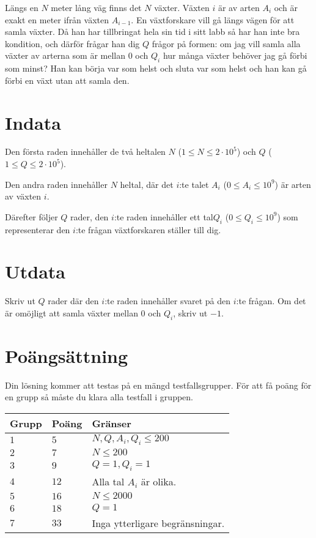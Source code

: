 Längs en $N$ meter lång väg finns det $N$ växter. Växten $i$ är av arten $A_i$ och är exakt en meter ifrån växten $A_{i-1}$. En växtforskare vill gå längs vägen för att samla växter. Då han har tillbringat hela sin tid i sitt labb så har han inte bra kondition,
och därför frågar han dig $Q$ frågor på formen: om jag vill samla alla växter av arterna som är mellan $0$ och $Q_i$ hur många växter behöver jag gå förbi som minst? 
Han kan börja var som helst och sluta var som helst och han kan gå förbi en växt utan att samla den.

\section*{Indata}
Den första raden innehåller de två heltalen $N$ ($1\leq N \leq 2 \cdot 10^5$) och $Q$ ($1 \leq Q \leq 2 \cdot 10^5$).

Den andra raden innehåller $N$ heltal, där det $i$:te talet $A_i$ ($0\le A_i \le 10^9$) är arten av växten $i$.

Därefter följer $Q$ rader, den $i$:te raden innehåller ett tal$Q_i$ ($0 \leq Q_i \leq 10^9$) som representerar den $i$:te frågan växtforskaren ställer till dig.

\section*{Utdata}
Skriv ut $Q$ rader där den $i$:te raden innehåller svaret på den $i$:te frågan. Om det är omöjligt att samla växter mellan $0$ och $Q_i$, skriv ut $-1$.

\section*{Poängsättning}
Din lösning kommer att testas på en mängd testfallsgrupper.
För att få poäng för en grupp så måste du klara alla testfall i gruppen.

\noindent
\begin{tabular}{| l | l | p{12cm} |}
  \hline
  \textbf{Grupp} & \textbf{Poäng} & \textbf{Gränser} \\ \hline
  $1$   & $5$       & $N, Q, A_i, Q_i \leq 200 $\\ \hline
  $2$   & $7$       & $N \leq 200 $\\ \hline
  $3$   & $9$       & $Q=1, Q_i=1$\\ \hline
  $4$   & $12$       & Alla tal $A_i$ är olika. \\ \hline
  $5$   & $16$       & $N \leq 2000 $  \\ \hline
  $6$   & $18$       & $Q = 1$ \\ \hline
  $7$   & $33$       & Inga ytterligare begränsningar. \\ \hline
\end{tabular}

